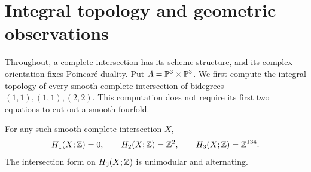 \section{Integral topology and geometric observations}
\label{sec:integral-topology}

Throughout, a complete intersection has its scheme structure, and its
complex orientation fixes Poincar\'e duality. Put $A=\mathbb P^3\times\mathbb P^3$.
We first compute the integral topology of every smooth complete
intersection of bidegrees $(1,1),(1,1),(2,2)$. This computation does
not require its first two equations to cut out a smooth fourfold.

\begin{proposition}\label{prop:middle-lattice}
For any such smooth complete intersection $X$,
\[
 H_1(X;\mathbb Z)=0,\qquad H_2(X;\mathbb Z)=\mathbb Z^2,\qquad H_3(X;\mathbb Z)=\mathbb Z^{134}.
\]
The intersection form on $H_3(X;\mathbb Z)$ is unimodular and alternating.
\end{proposition}

